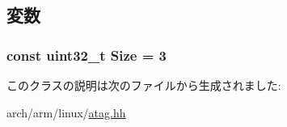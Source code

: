 \subsection{変数}
\hypertarget{classAtagCmdline_a7ecea14dd0f3277e19580d4509fafdba}{
\subsubsection[{Size}]{\setlength{\rightskip}{0pt plus 5cm}const {\bf uint32\_\-t} {\bf Size} = 3}}
\label{classAtagCmdline_a7ecea14dd0f3277e19580d4509fafdba}


このクラスの説明は次のファイルから生成されました:\begin{DoxyCompactItemize}
\item 
arch/arm/linux/\hyperlink{atag_8hh}{atag.hh}\end{DoxyCompactItemize}
